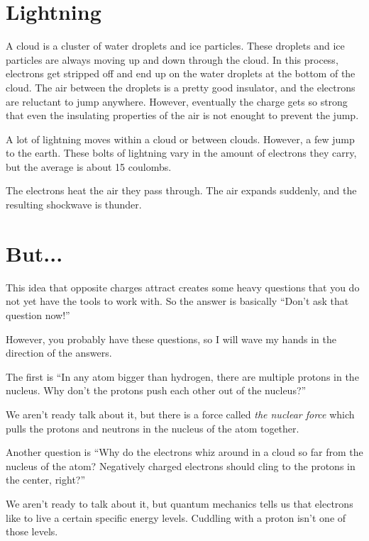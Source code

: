 \section{Lightning}

A cloud is a cluster of water droplets and ice particles. These
droplets and ice particles are always moving up and down through the
cloud. In this process, electrons get stripped off and end up on the
water droplets at the bottom of the cloud. The air between the
droplets is a pretty good insulator, and the electrons are reluctant
to jump anywhere. However, eventually the charge gets so strong that
even the insulating properties of the air is not enought to prevent
the jump.

A lot of lightning moves within a cloud or between clouds. However, a
few jump to the earth. These bolts of lightning vary in the amount of
electrons they carry, but the average is about 15 coulombs.

The electrons heat the air they pass through. The air expands
suddenly, and the resulting shockwave is thunder.

\section{But...}

This idea that opposite charges attract creates some heavy questions
that you do not yet have the tools to work with. So the answer is
basically ``Don't ask that question now!''

However, you probably have these questions, so I will wave my hands in
the direction of the answers.

The first is ``In any atom bigger than hydrogen, there are multiple
protons in the nucleus. Why don't the protons push each other out of
the nucleus?''

We aren't ready talk about it, but there is a force called \textit{the
  nuclear force} which pulls the protons and neutrons in the nucleus
of the atom together.

Another question is ``Why do the electrons whiz around in a cloud so
far from the nucleus of the atom? Negatively charged electrons should
cling to the protons in the center, right?''

We aren't ready to talk about it, but quantum mechanics tells us that
electrons like to live a certain specific energy levels. Cuddling with
a proton isn't one of those levels.
